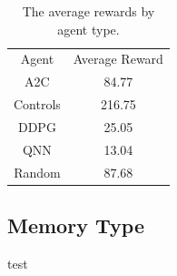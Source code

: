 \begin{table}[!htbp]
    \renewcommand{\arraystretch}{1.3}

    \caption{The average rewards by agent type.}
    \label{tab:agent-average-reward}

    \centering
    \begin{tabular}{|c|c|}
        \hline
        Agent    & Average Reward \\
        \hhline{|=|=|}
        A2C      & 84.77          \\
        \hline
        Controls & 216.75         \\
        \hline
        DDPG     & 25.05          \\
        \hline
        QNN      & 13.04          \\
        \hline
        Random   & 87.68          \\
        \hline
    \end{tabular}
\end{table}

\subsection{Memory Type}\label{subsec:memory-type}
test

